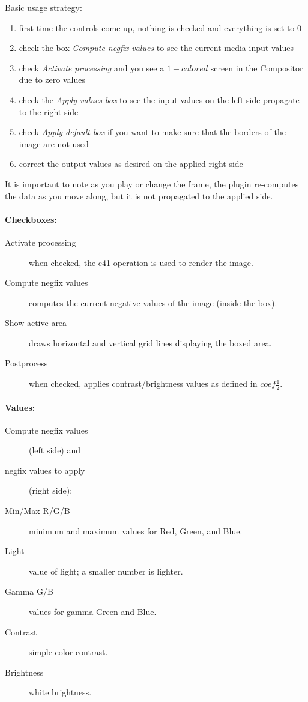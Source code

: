 Basic usage strategy:
\begin{enumerate}
    \item first time the controls come up, nothing is checked and everything is set to $0$
    \item check the box \textit{Compute negfix values} to see the current media input values
    \item check \textit{Activate processing} and you see a $1-colored$ screen in the Compositor due to zero values
    \item check the \textit{Apply values box} to see the input values on the left side propagate to the right side
    \item check \textit{Apply default box} if you want to make sure that the borders of the image are not used
    \item correct the output values as desired on the applied right side
\end{enumerate}

It is important to note as you play or change the frame, the plugin re-computes the data as you move along, but it is not propagated to the applied side.


\paragraph{Checkboxes:}
    \begin{description}
        \item[Activate processing] when checked, the c41 operation is used to render the image.
        \item[Compute negfix values] computes the current negative values of the image (inside the box).
        \item[Show active area] draws horizontal and vertical grid lines displaying the boxed area.
        \item[Postprocess] when checked, applies contrast/brightness values as defined in $coef\frac{1}{2}$.        
    \end{description}
\paragraph{Values:}
    \begin{description}
        \item[Compute negfix values] (left side) and
        \item[negfix values to apply] (right side):
        \item[Min/Max R/G/B] minimum and maximum values for Red, Green, and Blue.
        \item[Light] value of light; a smaller number is lighter.
        \item[Gamma G/B] values for gamma Green and Blue.
        \item[Contrast] simple color contrast.
        \item[Brightness] white brightness.
    \end{description}
